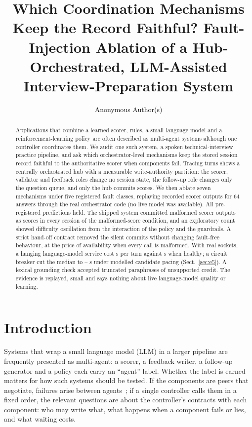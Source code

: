 \documentclass[runningheads]{llncs}
\begin{document}
\title{Which Coordination Mechanisms Keep the Record Faithful? Fault-Injection Ablation of a Hub-Orchestrated, LLM-Assisted Interview-Preparation System}
\author{Anonymous Author(s)}
\maketitle

\begin{abstract}
Applications that combine a learned scorer, rules, a small language model and a reinforcement-learning policy are often described as multi-agent systems although one controller coordinates them. We audit one such system, a spoken technical-interview practice pipeline, and ask which orchestrator-level mechanisms keep the stored session record faithful to the authoritative scorer when components fail. Tracing \nTurns{} turns shows a centrally orchestrated hub with a measurable write-authority partition: the scorer, validator and feedback roles change no session state, the follow-up role changes only the question queue, and only the hub commits scores. We then ablate seven mechanisms under five registered fault classes, replaying recorded scorer outputs for 64 answers through the real orchestrator code (no live model was available). All \predTotal{} pre-registered predictions held. The shipped system committed malformed scorer outputs as scores in every session of the malformed-score condition, and an exploratory count showed difficulty oscillation from the interaction of the policy and the guardrails. A strict hand-off contract removed the silent commits without changing fault-free behaviour, at the price of availability when every call is malformed. With real sockets, a hanging language-model service cost \twoHangMed{} s per turn against \twoOkMed{} s when healthy; a circuit breaker cut the median to \fiveMedSThirty--\fiveMedSSixty{} s under modelled candidate pacing (Sect.~\ref{sec:e5}). A lexical grounding check accepted truncated paraphrases of unsupported credit. The evidence is replayed, small and says nothing about live language-model quality or learning.
\end{abstract}

\section{Introduction}
Systems that wrap a small language model (LLM) in a larger pipeline are frequently presented as multi-agent: a scorer, a feedback writer, a follow-up generator and a policy each carry an ``agent'' label. Whether the label is earned matters for how such systems should be tested. If the components are peers that negotiate, failures arise between agents~\cite{mast}; if a single controller calls them in a fixed order, the relevant questions are about the controller's contracts with each component: who may write what, what happens when a component fails or lies, and what waiting costs.
\end{document}
